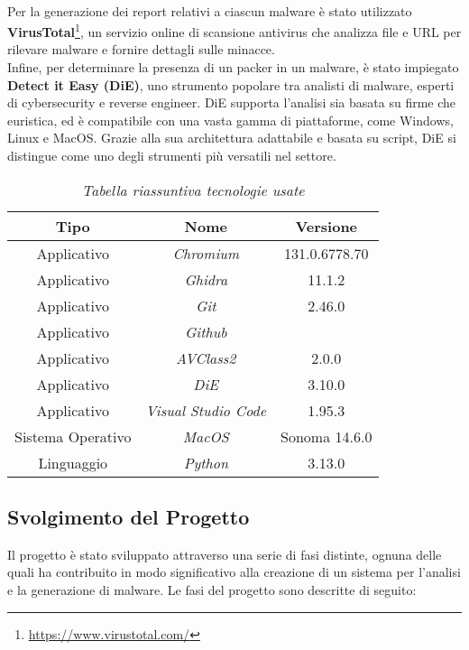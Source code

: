 \\  
Per la generazione dei report relativi a ciascun malware è stato utilizzato \textbf{VirusTotal}\footnote{\url{https://www.virustotal.com/}}, un servizio online di scansione antivirus che analizza file e URL per rilevare malware e fornire dettagli sulle minacce.  
\\  
Infine, per determinare la presenza di un packer in un malware, è stato impiegato \textbf{Detect it Easy (DiE)}\cite{site:detectiteasy}, uno strumento popolare tra analisti di malware, esperti di cybersecurity e reverse engineer. DiE supporta l'analisi sia basata su firme che euristica, ed è compatibile con una vasta gamma di piattaforme, come Windows, Linux e MacOS. Grazie alla sua architettura adattabile e basata su script, DiE si distingue come uno degli strumenti più versatili nel settore.

\hfill
\begin{table}[!h]
    \centering
    \begin{tabular}{|c|c|c|}
        \hline
        \textbf{Tipo} & \textbf{Nome} & \textbf{Versione} \\
        \hline
        Applicativo & \emph{Chromium} & 131.0.6778.70 \\
        \hline
        Applicativo & \emph{Ghidra} & 11.1.2 \\
        \hline
        Applicativo & \emph{Git} & 2.46.0 \\
        \hline
        Applicativo & \emph{Github} &  \\
        \hline
        Applicativo & \emph{AVClass2} & 2.0.0 \\
        \hline
        Applicativo & \emph{DiE} & 3.10.0 \\
        \hline
        Applicativo & \emph{Visual Studio Code} & 1.95.3 \\
        \hline
        Sistema Operativo & \emph{MacOS} & Sonoma 14.6.0 \\
        \hline
        Linguaggio & \emph{Python} & 3.13.0 \\
        \hline
    \end{tabular}
    \vspace*{.2cm}
    \caption{\emph{Tabella riassuntiva tecnologie usate}}
    \label{table-tecnologie}
\end{table}

\subsection{Svolgimento del Progetto}
Il progetto è stato sviluppato attraverso una serie di fasi distinte, ognuna delle quali ha contribuito in modo significativo alla creazione di un sistema per l'analisi e la generazione di malware. Le fasi del progetto sono descritte di seguito:

